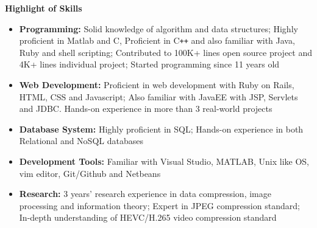 \documentclass[letterpaper,10pt]{article}
\newcommand{\resheading}[1]{{\large \colorbox{mygrey}{\begin{minipage}{\textwidth}{\textbf{#1 \vphantom{p\^{E}}}}\end{minipage}}}}
\begin{document}
\resheading{Highlight of Skills}
\begin{itemize}
\itemsep0em
\item {\textbf {Programming:}} Solid knowledge of algorithm and data structures; Highly proficient in Matlab and C, Proficient in C{}\verb!++! and also familiar with Java, Ruby and shell scripting; Contributed to 100K+ lines open source project and 4K+ lines individual project; Started programming since 11 years old
\item{\textbf {Web Development:}} Proficient in web development with Ruby on Rails, HTML, CSS and Javascript; Also familiar with JavaEE with JSP, Servlets and JDBC. Hands-on experience in more than 3 real-world projects
\item{\textbf {Database System:}} Highly proficient in SQL; Hands-on experience in both Relational and NoSQL databases
\item{\textbf {Development Tools:}} Familiar with Visual Studio, MATLAB, Unix like OS, vim editor, Git/Github and Netbeans
\item{\textbf {Research:}} 3 years' research experience in data compression, image processing and information theory; Expert in JPEG compression standard; In-depth understanding of HEVC/H.265 video compression standard

\end{itemize}
\end{document}
